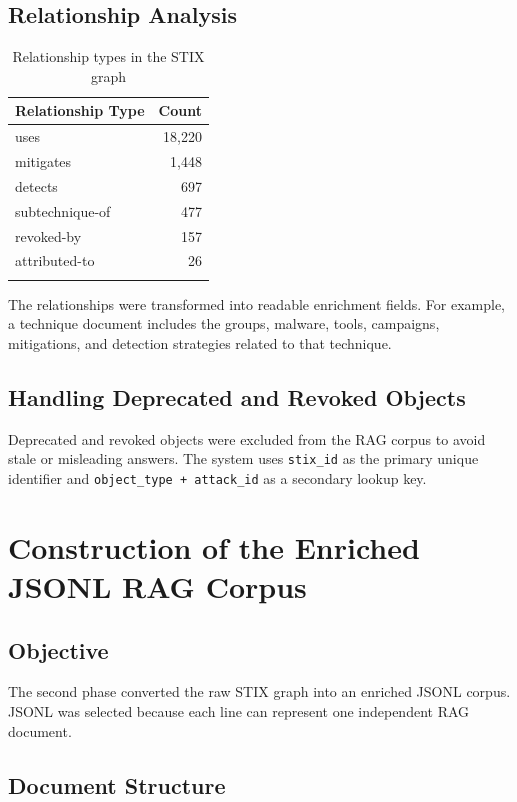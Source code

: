 \documentclass[12pt,a4paper]{report}
\begin{document}
\section{Relationship Analysis}

\begin{longtable}{lr}
\toprule
\textbf{Relationship Type} & \textbf{Count} \\
\midrule
\endhead
uses & 18,220 \\
mitigates & 1,448 \\
detects & 697 \\
subtechnique-of & 477 \\
revoked-by & 157 \\
attributed-to & 26 \\
\bottomrule
\caption{Relationship types in the STIX graph}
\end{longtable}

The relationships were transformed into readable enrichment fields. For example, a technique document includes the groups, malware, tools, campaigns, mitigations, and detection strategies related to that technique.

\section{Handling Deprecated and Revoked Objects}

Deprecated and revoked objects were excluded from the RAG corpus to avoid stale or misleading answers. The system uses \texttt{stix\_id} as the primary unique identifier and \texttt{object\_type + attack\_id} as a secondary lookup key.


\chapter{Construction of the Enriched JSONL RAG Corpus}

\section{Objective}

The second phase converted the raw STIX graph into an enriched JSONL corpus. JSONL was selected because each line can represent one independent RAG document.

\section{Document Structure}
\end{document}

